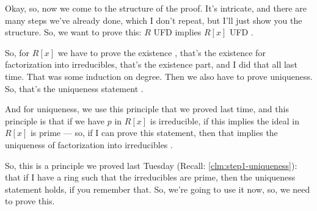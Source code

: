 \begin{speech}[00:11:20 - 00:13:05]
Okay, so, now we come to the structure of the proof. It's intricate, and there are many steps we've already done, which I don't repeat, but I'll just show you the structure. So, we want to prove this: $R$ UFD implies $R[x]$ UFD .

So, for $R[x]$ we have to prove the existence , that's the existence for factorization into irreducibles, that's the existence part, and I did that all last time. That was some induction on degree. Then we also have to prove uniqueness. So, that's the uniqueness statement .

And for uniqueness, we use this principle that we proved last time, and this principle is that if we have $p$ in $R[x]$ is irreducible, if this implies the ideal in $R[x]$ is prime  --- so, if I can prove this statement, then that implies the uniqueness of factorization into irreducibles .

So, this is a principle we proved last Tuesday (Recall: \cref{clm:step1-uniqueness}): that if I have a ring such that the irreducibles are prime, then the uniqueness statement holds, if you remember that. So, we're going to use it now, so, we need to prove this.
\end{speech}


\begin{content}
\end{content}

